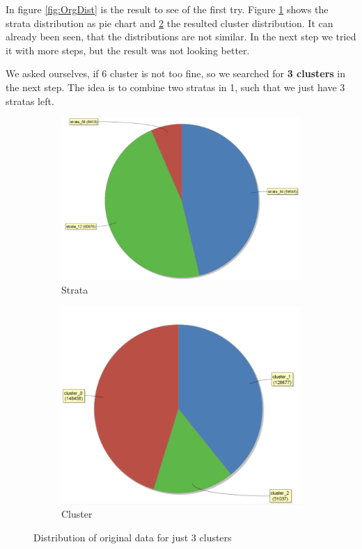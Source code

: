 In figure \ref{fig:OrgDist} is the result to see of the first try. Figure \ref{fig:OrgSt} shows the strata distribution as pie chart and \ref{fig:OrgCl} the resulted cluster distribution. It can already been seen, that the distributions are not similar. In the next step we tried it with more steps, but the result was not looking better.

We asked ourselves, if 6 cluster is not too fine, so we searched for \textbf{3 clusters} in the next step. The idea is to combine two stratas in 1, such that we just have 3 stratas left.
\begin{figure}[H]
\centering
\begin{subfigure}{.5\textwidth}
  \centering
  \includegraphics[width=.8\linewidth]{ClusterOrigRapidStrata2Cluster.PNG}
  \caption{Strata}
  \label{fig:OrgSt}
\end{subfigure}%
\begin{subfigure}{.5\textwidth}
  \centering
  \includegraphics[width=.8\linewidth]{ClusterOrigRapidCluster2Cluster.PNG}
  \caption{Cluster}
  \label{fig:OrgCl}
\end{subfigure}
\caption{Distribution of original data for just 3 clusters}
\label{fig:OrgDist3Cl}
\end{figure}

